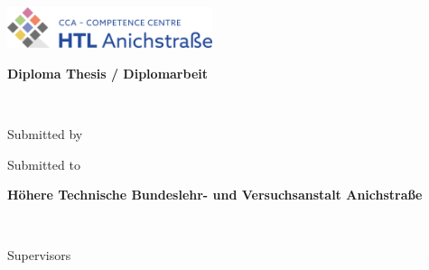 
\newcommand{\myworktitle}{Diploma Thesis / Diplomarbeit}  %
\newcommand{\myuniversity}{Höhere Technische Bundeslehr- und Versuchsanstalt Anichstraße} %
\newcommand{\mysubmissiontown}{Innsbruck}

\begin{titlepage}

{\sffamily

\begin{center}


\includegraphics[width=60mm]{figures/htl-logo}

\vfill\vfill\vfill
\vspace{1cm}
{\LARGE\bfseries\myworktitle}

\vfill\vfill\vfill

{\Large\bfseries\mytitle} \\
\mysubtitle

\vfill\vfill\vfill
\vfill\vfill\vfill



\vfill\vfill\vfill

\vspace{1cm}
Submitted by

{\bfseries\large\myauthor}
\vfill\vfill\vfill

\vspace{0.5cm}
Submitted to

\vfill

{\bfseries\large\myuniversity}
\vfill

\myinstitute\\

\vfill\vfill\vfill

\vspace{0.5cm}
Supervisors

\mysupervisor




\end{center}}
\end{titlepage}
